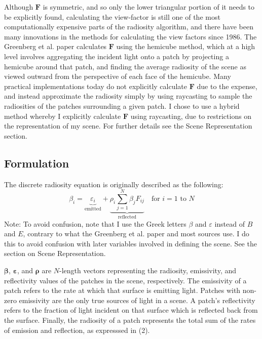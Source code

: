\documentclass[letter]{article}
\newcommand{\vect}[1]{\boldsymbol{#1}}
\begin{document}
Although $\vect{F}$ is symmetric, and so only the lower triangular portion of it needs to be explicitly found, calculating the view-factor is still one of the most computationally expensive parts of the radiosity algorithm, and there have been many innovations in the methods for calculating the view factors since 1986. The Greenberg et al. paper calculates $\vect{F}$ using the hemicube method, which at a high level involves aggregating the incident light onto a patch by projecting a hemicube around that patch, and finding the average radiosity of the scene as viewed outward from the perspective of each face of the hemicube. Many practical implementations today do not explicitly calculate $\vect{F}$ due to the expense, and instead approximate the radiosity simply by using raycasting to sample the radiosities of the patches surrounding a given patch. I chose to use a hybrid method whereby I explicitly calculate $\vect{F}$ using raycasting, due to restrictions on the representation of my scene. For further details see the Scene Representation section.

\subsection{Formulation}
The discrete radiosity equation is originally described as the following:\cite{greenberg86}
\begin{equation}
\beta_i = \underbrace{\varepsilon_i}_{\mathrm{emitted}} + \underbrace{\rho_i \sum_{j=1}^{N} \beta_j F_{ij}}_{\mathrm{reflected}} \quad \mbox{for $i=1$ to $N$}
\end{equation}
Note: To avoid confusion, note that I use the Greek letters $\beta$ and $\varepsilon$ instead of $B$ and $E$, contrary to what the Greenberg et al. paper and most sources use. I do this to avoid confusion with later variables involved in defining the scene. See the section on Scene Representation.

$\vect{\beta}$, $\vect{\varepsilon}$, and $\vect{\rho}$ are $N$-length vectors representing the radiosity, emissivity, and reflectivity values of the patches in the scene, respectively. The emissivity of a patch refers to the rate at which that surface is emitting light. Patches with non-zero emissivity are the only true sources of light in a scene. A patch's reflectivity refers to the fraction of light incident on that surface which is reflected back from the surface. Finally, the radiosity of a patch represents the total sum of the rates of emission and reflection, as expresssed in (2).
\end{document}
